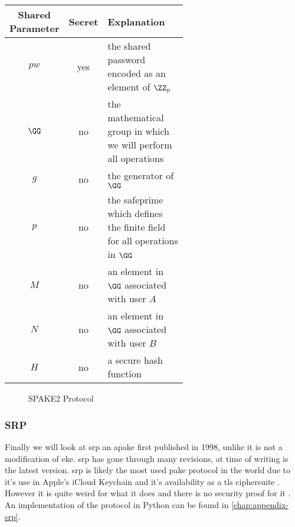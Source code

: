\begin{center}
  \begin{tabular}{ ccp{0.6\linewidth} }
    \toprule
    Shared Parameter & Secret & Explanation \\
    \midrule
    $pw$ & yes & the shared password encoded as an element of $\ZZ_p$ \\
    $\GG$ & no & the mathematical group in which we will perform all operations \\ 
    $g$ & no & the generator of $\GG$ \\
    $p$ & no & the \gls{safeprime} which defines the finite field for all operations in $\GG$ \\
    $M$ & no & an element in $\GG$ associated with user $A$ \\
    $N$ & no & an element in $\GG$ associated with user $B$ \\
    $H$ & no & a secure hash function \\
    \bottomrule
  \end{tabular}
\end{center}

\begin{figure}[H]

  \caption{SPAKE2 Protocol}
  \label{fig:spake2}
\end{figure}

\clearpage

\subsubsection{SRP}
Finally we will look at \gls{srp} an \gls{apake} first published in 1998, unlike  it is not a modification of \gls{eke}.
\gls{srp} has gone through many revisions, at time of writing  is the latest version.
\gls{srp} is likely the most used \gls{pake} protocol in the world due to it's use in Apple's iCloud Keychain \cite{apple-keychain-srp} and it's availability as a \gls{tls} ciphersuite \cite{tls-srp}.
However it is quite weird for what it does and there is no security proof for it \cite{srp-blog}. An implementation of the protocol in Python can be found in \cref{chap:appendix-srp}.

